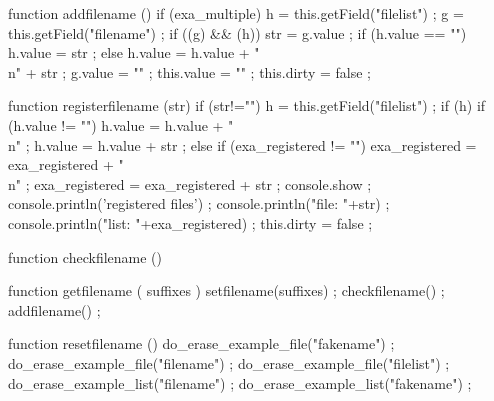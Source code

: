     function addfilename () {
        if (exa_multiple) {
            h = this.getField("filelist") ;
            g = this.getField("filename") ;
            if ((g) && (h)) {
                str = g.value ;
                if (h.value == "") {
                    h.value = str ;
                } else {
                    h.value = h.value + "\\n" + str ;
                }
                g.value = "" ;
                this.value = "" ;
            }
        }
        this.dirty = false ;
    }


    function registerfilename (str) {
        if (str!="") {
            h = this.getField("filelist") ;
            if (h) {
                if (h.value != "") {
                    h.value = h.value + "\\n" ;
                }
                h.value = h.value + str ;
            } else {
                if (exa_registered != "") {
                    exa_registered = exa_registered + "\\n" ;
                }
                exa_registered = exa_registered + str ;
            }
        }
        console.show ;
        console.println('registered files') ;
        console.println("file: "+str) ;
        console.println("list: "+exa_registered) ;
        this.dirty = false ;
    }

    function checkfilename () {
    }

    function getfilename ( suffixes ) {
        setfilename(suffixes) ;
        checkfilename() ;
        addfilename() ;
    }

    function resetfilename () {
        do_erase_example_file("fakename") ;
        do_erase_example_file("filename") ;
        do_erase_example_file("filelist") ;
        do_erase_example_list("filename") ;
        do_erase_example_list("fakename") ;
    }

\stopJSpreamble

\endinput
